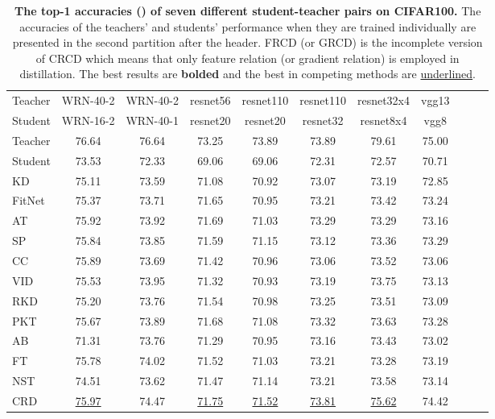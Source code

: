 \documentclass[final]{cvpr}
\begin{document}
\begin{table*}[th]
\small
    \centering
    \caption{ \textbf{The top-1 accuracies () of seven different  student-teacher pairs on CIFAR100.}
The accuracies of the teachers' and students' performance when they are trained individually are presented in the second partition after the header.
FRCD (or GRCD) is the incomplete version of CRCD which  means that only feature relation (or gradient relation) is employed in distillation. The best results are \textbf{bolded} and the best in competing methods are \underline{underlined}.}
    \begin{tabular}{lcccccccccc}
\toprule
Teacher & WRN-40-2 & WRN-40-2 & resnet56 & resnet110 & resnet110 & resnet32x4 & vgg13  \\
Student & WRN-16-2 & WRN-40-1 & resnet20 & resnet20 & resnet32 & resnet8x4 & vgg8 \\
\midrule
Teacher & 76.64 & 76.64 & 73.25 & 73.89 & 73.89 & 79.61 & 75.00 \\
Student & 73.53 & 72.33 & 69.06 & 69.06 & 72.31 & 72.57 & 70.71 \\
\midrule
KD \cite{hinton2015distilling}    & 75.11 & 73.59 & 71.08 & 70.92 & 73.07 & 73.19 & 72.85 \\
FitNet \cite{romero2014fitnets} & 75.37 & 73.71 & 71.65 & 70.95 & 73.21 & 73.42 & 73.24 \\
AT \cite{ATloss}    & 75.92 & 73.92 & 71.69 & 71.03 & 73.29 & 73.29 & 73.16 \\
SP \cite{tung2019similarity}    & 75.84 & 73.85 & 71.59 & 71.15 & 73.12 & 73.36 & 73.29 \\
CC  \cite{peng2019correlation}   & 75.89 & 73.69 & 71.42 & 70.96 & 73.06 & 73.52 & 73.06 \\
VID  \cite{vid}  & 75.53 & 73.95 & 71.32 & 70.93 & 73.19 & 73.75 & 73.13 \\
RKD \cite{park2019relational}  & 75.20 & 73.76 & 71.54 & 70.98 & 73.25 & 73.51 & 73.09 \\
PKT \cite{pkt}    & 75.67 & 73.89 & 71.68 & 71.08 & 73.32 & 73.63 & 73.28 \\
AB  \cite{ab}   & 71.31 & 73.76 & 71.29 & 70.95 & 73.16 & 73.43 & 73.02 \\
FT \cite{factor}   & 75.78 & 74.02 & 71.52 & 71.03 & 73.21 & 73.28 & 73.19 \\
NST \cite{NST}   & 74.51 & 73.62 & 71.47 & 71.14 & 73.21 & 73.58 & 73.14 \\
CRD  \cite{crd}  & \underline{75.97} & 74.47 & \underline{71.75} & \underline{71.52} & \underline{73.81} & \underline{75.62} & 74.42 \\

\end{tabular}
\end{table*}
\end{document}
